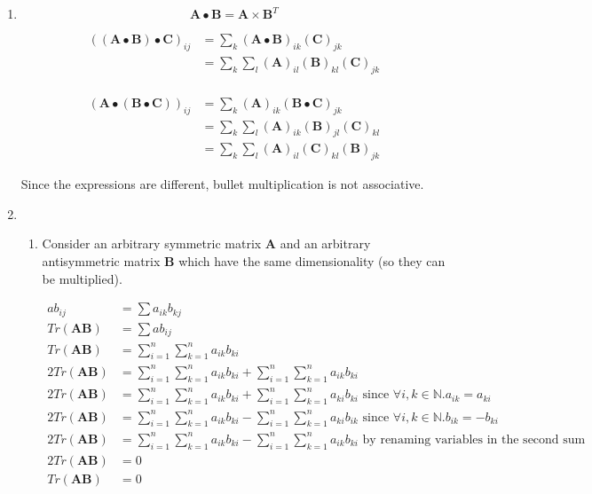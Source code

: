 \documentclass[10pt,oneside,a4paper]{article}
\begin{document}
\begin{enumerate}
\item 

\[
\mathbf{A} \bullet \mathbf{B} = \mathbf{A} \times \mathbf{B}^T
\]

\[
\begin{split}
((\mathbf{A} \bullet \mathbf{B}) \bullet \mathbf{C})_{ij} &= \sum_k(\mathbf{A} \bullet \mathbf{B})_{ik}(\mathbf{C})_{jk} \\
&= \sum_k\sum_l(\mathbf{A})_{il}(\mathbf{B})_{kl}(\mathbf{C})_{jk} \\
\end{split}
\]

\[
\begin{split}
(\mathbf{A} \bullet (\mathbf{B} \bullet \mathbf{C}))_{ij} &= \sum_k(\mathbf{A})_{ik}(\mathbf{B}\bullet\mathbf{C})_{jk} \\
 &= \sum_k\sum_l(\mathbf{A})_{ik}(\mathbf{B})_{jl}(\mathbf{C})_{kl} \\
 &= \sum_k\sum_l(\mathbf{A})_{il}(\mathbf{C})_{kl}(\mathbf{B})_{jk}
\end{split}
\]

Since the expressions are different, bullet multiplication is not associative.

\item 

\begin{enumerate}

\item 

Consider an arbitrary symmetric matrix $\mathbf{A}$ and an arbitrary antisymmetric matrix $\mathbf{B}$ which have 
the same dimensionality (so they can be multiplied).

\[
\begin{split}
ab_{ij} &= \sum a_{ik}b_{kj} \\
Tr(\mathbf{AB}) &= \sum ab_{ij} \\
Tr(\mathbf{AB}) &= \sum^n_{i=1} \sum^n_{k=1} a_{ik}b_{ki} \\
2Tr(\mathbf{AB}) &= \sum^n_{i=1} \sum^n_{k=1} a_{ik}b_{ki} + \sum^n_{i=1} \sum^n_{k=1} a_{ik}b_{ki} \\
2Tr(\mathbf{AB}) &= \sum^n_{i=1} \sum^n_{k=1} a_{ik}b_{ki} + \sum^n_{i=1} \sum^n_{k=1} a_{ki}b_{ki} \text{ since } \forall i, k \in \mathbb{N}. a_{ik} = a_{ki} \\
2Tr(\mathbf{AB}) &= \sum^n_{i=1} \sum^n_{k=1} a_{ik}b_{ki} - \sum^n_{i=1} \sum^n_{k=1} a_{ki}b_{ik} \text{ since } \forall i, k \in \mathbb{N}. b_{ik} = -b_{ki} \\
2Tr(\mathbf{AB}) &= \sum^n_{i=1} \sum^n_{k=1} a_{ik}b_{ki} - \sum^n_{i=1} \sum^n_{k=1} a_{ik}b_{ki} \text{ by renaming variables in the second sum} \\
2Tr(\mathbf{AB}) &= 0 \\
Tr(\mathbf{AB}) &= 0 \\
\end{split}
\]


\end{enumerate}
\end{enumerate}
\end{document}
